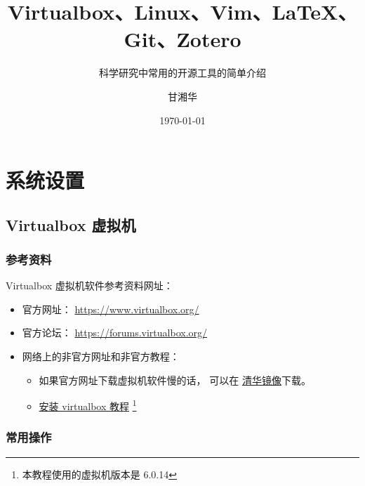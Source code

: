 \documentclass[cn,11pt, simple]{elegantbook}
\title{Virtualbox、Linux、Vim、\LaTeX{}、Git、Zotero}
\subtitle{科学研究中常用的开源工具的简单介绍}
\author{甘湘华}
\institute{西南财经大学}
\date{\today}
\begin{document}
\maketitle

\tableofcontents

\mainmatter
\hypersetup{pageanchor=true}

\chapter{系统设置}
\label{cha:settings-system}

\section{Virtualbox 虚拟机}%
\label{sec:virtualbox}


\subsection{参考资料}%
\label{sub:virtualbox-refs}

Virtualbox 虚拟机软件参考资料网址：
\begin{itemize}
    \item 官方网址： \href{https://www.virtualbox.org/}{https://www.virtualbox.org/}
    \item 官方论坛： \href{https://forums.virtualbox.org/}{https://forums.virtualbox.org/}
    \item 网络上的非官方网址和非官方教程：
        \begin{itemize}
            \item 如果官方网址下载虚拟机软件慢的话，
                可以在
                \href{https://mirror.tuna.tsinghua.edu.cn/virtualbox/6.0.14/}
                {清华镜像}下载。
            \item \href{https://www.jianshu.com/p/bfb4f4415411}
                {安装 virtualbox 教程}
                \footnote{本教程使用的虚拟机版本是 6.0.14}
        \end{itemize}
\end{itemize}

\subsection{常用操作}%
\label{sub:virtualbox-tips}
\end{document}
